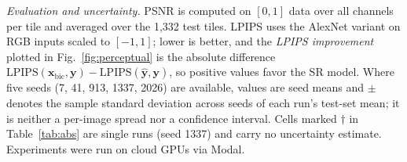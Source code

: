 \documentclass[conference]{IEEEtran}
\begin{document}
\emph{Evaluation and uncertainty.} PSNR is computed on $[0,1]$ data
over all channels per tile and averaged over the 1{,}332 test tiles.
LPIPS \cite{zhang2018lpips} uses the AlexNet variant on RGB inputs
scaled to $[-1,1]$; lower is better, and the \emph{LPIPS improvement}
plotted in Fig.~\ref{fig:perceptual} is the absolute difference
$\mathrm{LPIPS}(\mathbf{x}_{\mathrm{bic}},\mathbf{y})-
\mathrm{LPIPS}(\hat{\mathbf{y}},\mathbf{y})$, so positive values
favor the SR model. Where five seeds (7, 41, 913, 1337, 2026) are
available, values are seed means and $\pm$ denotes the sample standard
deviation across seeds of each run's test-set mean; it is neither a
per-image spread nor a confidence interval. Cells marked $\dagger$ in
Table~\ref{tab:abs} are single runs (seed 1337) and carry no
uncertainty estimate. Experiments were run on cloud GPUs via Modal.
\end{document}

